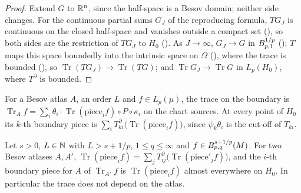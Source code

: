 \begin{proof}
\leanok
Extend $G$ to $\mathbb{R}^n$, since the half-space is a Besov domain; neither side changes. For the
continuous partial sums $G_J$ of the reproducing formula, $T G_J$ is continuous on the closed
half-space and vanishes outside a compact set (), so both sides are the
restriction of $T G_J$ to $H_0$ (). As $J \to \infty$,
$G_J \to G$ in $B^{1/p}_{p,1}$ (); $T$ maps this space boundedly
into the intrinsic space on $\Omega$ (), where the trace is bounded
(), so $\operatorname{Tr}(T G_J) \to \operatorname{Tr}(T G)$; and
$\operatorname{Tr} G_J \to \operatorname{Tr} G$ in $L_p(H_0)$, where $T^\partial$ is bounded.
\end{proof}

\begin{definition}
\label{def:manifold-boundary-trace}
\leanok
{}
For a Besov atlas $A$, an order $L$ and $f \in L_p(\mu)$, the trace on the boundary is
$\operatorname{Tr}_A f = \sum_i \theta_i \cdot \operatorname{Tr}(\text{piece}_i f) \circ P \circ
\kappa_i$ on the chart sources. At every point of $H_0$ its $k$-th boundary piece is
$\sum_i T^\partial_{ki} \bigl(\operatorname{Tr}(\text{piece}_i f)\bigr)$, since $\psi_k \theta_i$
is the cut-off of $T_{ki}$.
\end{definition}

\begin{theorem}
\label{thm:boundary-trace-pieces}
\leanok
{}
Let $s > 0$, $L \in \mathbb{N}$ with $L > s + 1/p$, $1 \leq q \leq \infty$ and
$f \in B^{s+1/p}_{p,q}(M)$. For two Besov atlases $A, A'$,
$\operatorname{Tr}(\text{piece}_i f) = \sum_j T^\partial_{ij}
\bigl(\operatorname{Tr}(\text{piece}'_j f)\bigr)$, and the $i$-th boundary piece for $A$ of
$\operatorname{Tr}_{A'} f$ is $\operatorname{Tr}(\text{piece}_i f)$ almost everywhere on $H_0$. In
particular the trace does not depend on the atlas.
\end{theorem}

